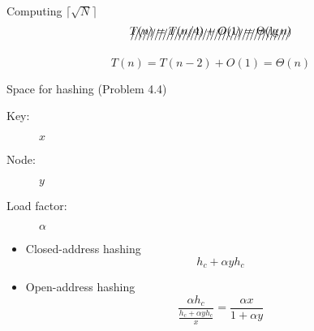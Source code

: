 \begin{frame}{Computing $\lceil \sqrt{N} \rceil$}
  \[ \xout{T(n) = T(n/4) + O(1) = \Theta(\lg n)} \]

  \[ T(n) = T(n - 2) + O(1) = \Theta(n) \]
\end{frame}
\begin{frame}{Space for hashing (Problem 4.4)}
  \begin{description}
	\item[Key:] $x$
	\item[Node:] $y$
	\item[Load factor:] $\alpha$
  \end{description}

  \pause
  \begin{itemize}
	\item Closed-address hashing
	  \[
		h_c + \alpha y h_c
	  \]
	\item Open-address hashing
	  \[
		\frac{\alpha h_c}{\frac{h_c + \alpha y h_c }{x}} = \frac{\alpha x}{1 + \alpha y}
	  \]
  \end{itemize}
\end{frame}
\begin{frame}[noframenumbering]
\end{frame}
